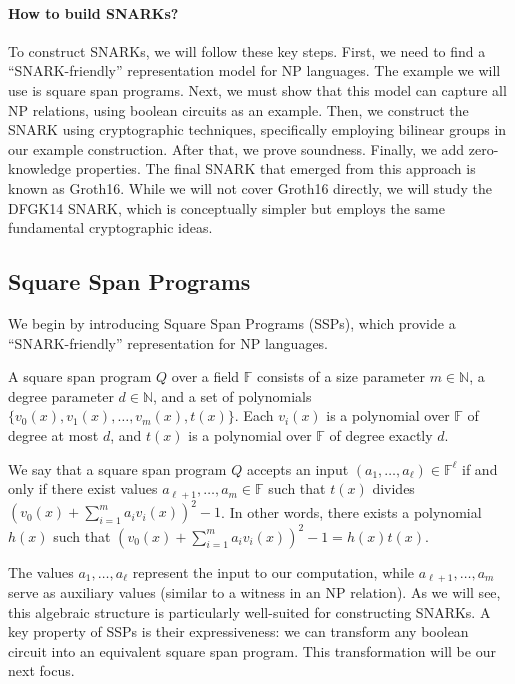 \paragraph{How to build SNARKs?} To construct SNARKs, we will follow these key steps. First, we need to find a ``SNARK-friendly'' representation model for NP languages. The example we will use is square span programs. Next, we must show that this model can capture all NP relations, using boolean circuits as an example. Then, we construct the SNARK using cryptographic techniques, specifically employing bilinear groups in our example construction. After that, we prove soundness. Finally, we add zero-knowledge properties. The final SNARK that emerged from this approach is known as Groth16. While we will not cover Groth16 directly, we will study the DFGK14 SNARK, which is conceptually simpler but employs the same fundamental cryptographic ideas.

\subsection{Square Span Programs}

We begin by introducing Square Span Programs (SSPs), which provide a ``SNARK-friendly'' representation for NP languages.

\begin{definition}
A square span program $Q$ over a field $\mathbb{F}$ consists of a size parameter $m \in \mathbb{N}$, a degree parameter $d \in \mathbb{N}$, and a set of polynomials $\{v_0(x), v_1(x), \dots, v_m(x), t(x)\}$. Each $v_i(x)$ is a polynomial over $\mathbb{F}$ of degree at most $d$, and $t(x)$ is a polynomial over $\mathbb{F}$ of degree exactly $d$.
\end{definition}

\begin{definition}
We say that a square span program $Q$ accepts an input $(a_1, \dots, a_\ell) \in \mathbb{F}^\ell$ if and only if there exist values $a_{\ell+1}, \dots, a_m \in \mathbb{F}$ such that $t(x)$ divides $(v_0(x) + \sum_{i=1}^m a_i v_i(x))^2 - 1$. In other words, there exists a polynomial $h(x)$ such that $(v_0(x) + \sum_{i=1}^m a_i v_i(x))^2 - 1 = h(x)t(x)$.
\end{definition}

The values $a_1, \dots, a_\ell$ represent the input to our computation, while $a_{\ell+1}, \dots, a_m$ serve as auxiliary values (similar to a witness in an NP relation). As we will see, this algebraic structure is particularly well-suited for constructing SNARKs. A key property of SSPs is their expressiveness: we can transform any boolean circuit into an equivalent square span program. This transformation will be our next focus.

